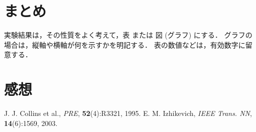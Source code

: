 \documentclass[12pt]{jarticle}
\begin{document}
\section{まとめ}
実験結果は，その性質をよく考えて，表 または 図 (グラフ) にする．
グラフの場合は，縦軸や横軸が何を示すかを明記する．
表の数値などは，有効数字に留意する．

\section{感想}

\begin{thebibliography}{99}
    \label{sannkoubunnkenn_chapter}
    J. J. Collins et al.,
    {\em PRE}, {\bf 52}(4):R3321, 1995.
     E. M. Izhikevich,
    {\em IEEE Trans. NN}, {\bf 14}(6):1569, 2003.
\end{thebibliography}

\clearpage

\appendix
\end{document}
